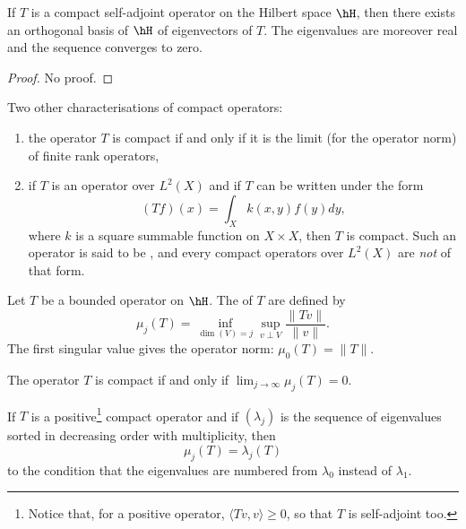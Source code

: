 \begin{theorem}
If $T$ is a compact self-adjoint operator on the Hilbert space $\hH$, then there exists an orthogonal basis of $\hH$ of eigenvectors of $T$. The eigenvalues are moreover real and the sequence converges to zero.
\end{theorem}
\begin{proof}
No proof.
\end{proof}
\begin{proposition}
Two other characterisations of compact operators:
\begin{enumerate}
\item the operator $T$ is compact if and only if it is the limit (for the operator norm) of finite rank operators,
\item if $T$ is an operator over $L^2(X)$ and if $T$ can be written under the form
\[ 
  (Tf)(x)=\int_X k(x,y)f(y)dy,
\]
where $k$ is a square summable function on $X\times X$, then $T$ is compact. Such an operator is said to be , and every compact operators over $L^2(X)$ are \emph{not} of that form.
\end{enumerate}
\end{proposition}

Let $T$ be a bounded operator on $\hH$. The  of $T$ are defined by
\begin{equation}
\mu_j(T)=\inf_{\dim(V)=j}\sup_{v\perp V}\frac{ \| Tv \| }{ \| v \| }.
\end{equation}
The first singular value gives the operator norm: $\mu_0(T)=\| T \|$.

\begin{proposition}
The operator $T$ is compact if and only if $\lim_{j\to\infty}\mu_j(T)=0$.
\end{proposition}

\begin{lemma}		\label{Lemmulamequ}
If $T$ is a positive\footnote{Notice that, for a positive operator, $\langle Tv, v\rangle \geq 0$, so that $T$ is self-adjoint too.} compact operator and if $(\lambda_j)$ is the sequence of eigenvalues sorted in decreasing order with multiplicity, then
\begin{equation}
\mu_j(T)=\lambda_j(T)
\end{equation}
to the condition that the eigenvalues are numbered from $\lambda_0$ instead of $\lambda_1$.
\end{lemma}

